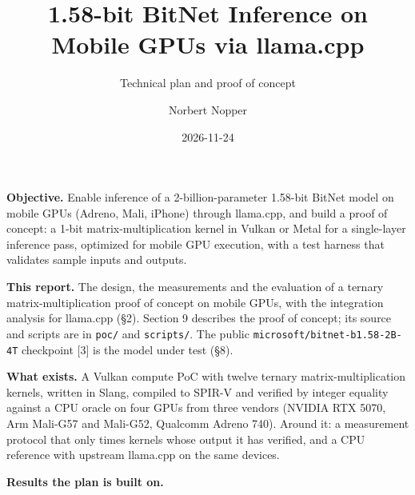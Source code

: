 \documentclass[
  10pt,
]{article}
\title{1.58-bit BitNet Inference on Mobile GPUs via llama.cpp}
\subtitle{Technical plan and proof of concept}
\author{Norbert Nopper}
\date{2026-11-24}
\begin{document}
\maketitle

\textbf{Objective.} Enable inference of a 2-billion-parameter 1.58-bit BitNet
model on mobile GPUs (Adreno, Mali, iPhone) through llama.cpp, and build
a proof of concept: a 1-bit matrix-multiplication kernel in Vulkan or
Metal for a single-layer inference pass, optimized for mobile GPU
execution, with a test harness that validates sample inputs and outputs.

\textbf{This report.} The design, the measurements and the evaluation of
a ternary matrix-multiplication proof of concept on mobile GPUs, with
the integration analysis for llama.cpp (\S{}2). Section 9 describes the
proof of concept; its source and scripts are in \texttt{poc/} and
\texttt{scripts/}. The public \texttt{microsoft/bitnet-b1.58-2B-4T}
checkpoint [3] is the model under test (\S{}8).

\textbf{What exists.} A Vulkan compute PoC with twelve ternary
matrix-multiplication kernels, written in Slang, compiled to SPIR-V and
verified by integer equality against a CPU oracle on four GPUs from
three vendors (NVIDIA RTX 5070, Arm Mali-G57 and Mali-G52, Qualcomm
Adreno 740). Around it: a measurement protocol that only times kernels
whose output it has verified, and a CPU reference with upstream
llama.cpp on the same devices.

\textbf{Results the plan is built on.}
\end{document}
